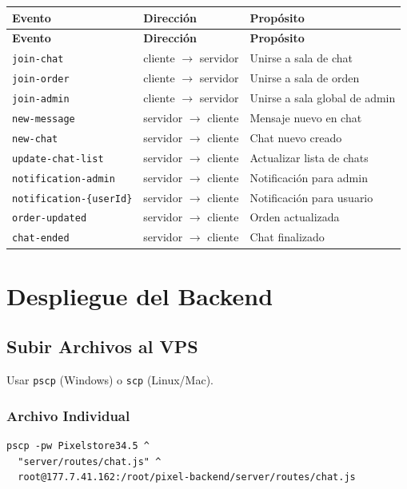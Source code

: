 \documentclass[12pt,a4paper]{article}
\begin{document}
\begin{longtable}{|l|l|l|}
\hline
\textbf{Evento} & \textbf{Dirección} & \textbf{Propósito} \\ \hline
\endfirsthead
\hline
\textbf{Evento} & \textbf{Dirección} & \textbf{Propósito} \\ \hline
\endhead
\texttt{join-chat} & cliente $\rightarrow$ servidor & Unirse a sala de chat \\ \hline
\texttt{join-order} & cliente $\rightarrow$ servidor & Unirse a sala de orden \\ \hline
\texttt{join-admin} & cliente $\rightarrow$ servidor & Unirse a sala global de admin \\ \hline
\texttt{new-message} & servidor $\rightarrow$ cliente & Mensaje nuevo en chat \\ \hline
\texttt{new-chat} & servidor $\rightarrow$ cliente & Chat nuevo creado \\ \hline
\texttt{update-chat-list} & servidor $\rightarrow$ cliente & Actualizar lista de chats \\ \hline
\texttt{notification-admin} & servidor $\rightarrow$ cliente & Notificación para admin \\ \hline
\texttt{notification-\{userId\}} & servidor $\rightarrow$ cliente & Notificación para usuario \\ \hline
\texttt{order-updated} & servidor $\rightarrow$ cliente & Orden actualizada \\ \hline
\texttt{chat-ended} & servidor $\rightarrow$ cliente & Chat finalizado \\ \hline
\end{longtable}

\newpage

\section{Despliegue del Backend}

\subsection{Subir Archivos al VPS}

Usar \texttt{pscp} (Windows) o \texttt{scp} (Linux/Mac).

\subsubsection{Archivo Individual}

\begin{lstlisting}
pscp -pw Pixelstore34.5 ^
  "server/routes/chat.js" ^
  root@177.7.41.162:/root/pixel-backend/server/routes/chat.js
\end{lstlisting}
\end{document}
